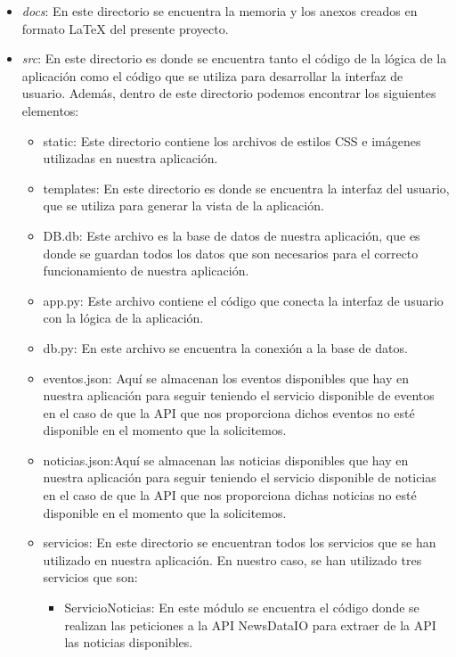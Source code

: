 \begin{itemize}
    \item \textit{docs}: En este directorio se encuentra la memoria y los anexos creados en formato LaTeX del presente proyecto.

    \item \textit{src}: En este directorio es donde se encuentra tanto el código de la lógica de la aplicación como el código que se utiliza para desarrollar la interfaz de usuario. Además, dentro de este directorio podemos 
    encontrar los siguientes elementos:
    \begin{itemize}
        \item static: Este directorio contiene los archivos de estilos CSS e imágenes utilizadas en nuestra aplicación.
        \item templates: En este directorio es donde se encuentra la interfaz del usuario, que se utiliza para generar la vista de la aplicación.
        \item DB.db: Este archivo  es la base de datos de nuestra aplicación, que es donde se guardan todos los datos que son necesarios para el correcto funcionamiento de nuestra aplicación.
        \item app.py: Este archivo  contiene el código que conecta la interfaz de usuario con la lógica de la aplicación.
        \item db.py: En este archivo se encuentra la conexión a la base de datos.
        \item eventos.json: Aquí se almacenan los eventos disponibles que hay en nuestra aplicación para seguir teniendo el servicio disponible de eventos en el caso de que la API que nos proporciona dichos eventos no esté disponible en el momento que la solicitemos.
        \item noticias.json:Aquí se almacenan las noticias disponibles que hay en nuestra aplicación para seguir teniendo el servicio disponible de noticias en el caso de que la API que nos proporciona dichas noticias no esté disponible en el momento que la solicitemos.
        \item servicios: En este directorio se encuentran todos los servicios que se han utilizado en nuestra aplicación. En nuestro caso, se han utilizado tres servicios que son:
        \begin{itemize}
            \item ServicioNoticias: En este módulo se encuentra el código donde se realizan las peticiones a la API NewsDataIO para extraer de la API las noticias disponibles.


\end{itemize}
\end{itemize}
\end{itemize}
